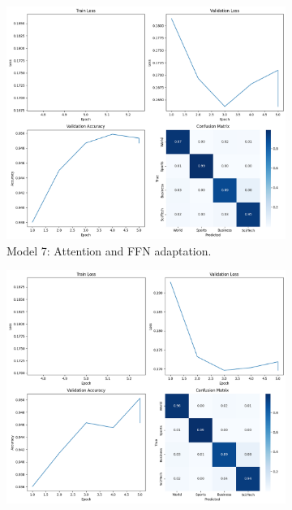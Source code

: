\documentclass[letterpaper]{article}
\begin{document}
\begin{figure}[h]
    \centering
    \begin{subfigure}[b]{0.15\textwidth}
        \centering
        \includegraphics[width=\linewidth]{images/model_4.png}
        \caption{Model 7: Attention and FFN adaptation.}
        \label{fig:model7}
    \end{subfigure}
    \hfill
    \begin{subfigure}[b]{0.15\textwidth}
        \centering
        \includegraphics[width=\linewidth]{images/model_5.png}

\end{subfigure}
\end{figure}
\end{document}
